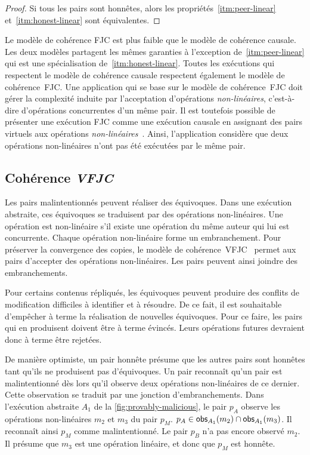 \begin{proof}
Si tous les pairs sont honnêtes, alors les propriétés~\ref{itm:peer-linear} et~\ref{itm:honest-linear} sont équivalentes.
\end{proof}

Le modèle de cohérence \ac{FJC} est plus faible que le modèle de cohérence causale.
Les deux modèles partagent les mêmes garanties à l'exception de~\ref{itm:peer-linear} qui est une spécialisation de~\ref{itm:honest-linear}.
Toutes les exécutions qui respectent le modèle de cohérence causale respectent également le modèle de cohérence~\ac{FJC}.
Une application qui se base sur le modèle de cohérence~\ac{FJC} doit gérer la complexité induite par l'acceptation d'opérations \emph{non-linéaires}, c'est-à-dire d'opérations concurrentes d'un même pair.
Il est toutefois possible de présenter une exécution \ac{FJC} comme une exécution causale en assignant des pairs virtuels aux opérations \emph{non-linéaires}~\autocite{mahajan_depot_2011}.
Ainsi, l'application considère que deux opérations non-linéaires n'ont pas été exécutées par le même pair.


\subsection{Cohérence \emph{\acl{VFJC}}}

Les pairs malintentionnés peuvent réaliser des équivoques.
Dans une exécution abstraite, ces équivoques se traduisent par des opérations non-linéaires.
Une opération est non-linéaire s'il existe une opération du même auteur qui lui est concurrente.
Chaque opération non-linéaire forme un embranchement.
Pour préserver la convergence des copies, le modèle de cohérence~\acf{VFJC}~\autocite{mahajan_2011_cac} permet aux pairs d'accepter des opérations non-linéaires.
Les pairs peuvent ainsi joindre des embranchements.

Pour certains contenus répliqués, les équivoques peuvent produire des conflits de modification difficiles à identifier et à résoudre.
De ce fait, il est souhaitable d'empêcher à terme la réalisation de nouvelles équivoques.
Pour ce faire, les pairs qui en produisent doivent être à terme évincés.
Leurs opérations futures devraient donc à terme être rejetées.

De manière optimiste, un pair honnête présume que les autres pairs sont honnêtes tant qu'ils ne produisent pas d'équivoques.
Un pair reconnaît qu'un pair est malintentionné dès lors qu'il observe deux opérations non-linéaires de ce dernier.
Cette observation se traduit par une jonction d'embranchements.
Dans l'exécution abstraite $A_1$ de la \autoref{fig:provably-malicious}, le pair $p_A$ observe les opérations non-linéaires $m_2$ et $m_3$ du pair $p_M$. $p_A \in \operatorname{\mathsf{obs}}_{A_1}(m_2) \cap \operatorname{\mathsf{obs}}_{A_1}(m_3)$.
Il reconnaît ainsi $p_M$ comme malintentionné.
Le pair $p_B$ n'a pas encore observé $m_2$. Il présume que $m_3$ est une opération linéaire, et donc que $p_M$ est honnête.


